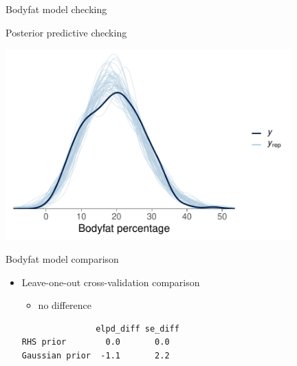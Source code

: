 \documentclass[english,t]{beamer}
\begin{document}
\begin{frame}
  
  {\Large\color{navyblue} Bodyfat model checking}

  Posterior predictive checking
  
  \includegraphics[width=11cm]{bodyfat_ppc.pdf}

\end{frame}

\begin{frame}[fragile]
  
  {\Large\color{navyblue} Bodyfat model comparison}

  \begin{itemize}
  \item Leave-one-out cross-validation comparison
    \begin{itemize}
    \item no difference
    \end{itemize}
\begin{verbatim}
               elpd_diff se_diff
RHS prior        0.0       0.0   
Gaussian prior  -1.1       2.2   
\end{verbatim}

\end{itemize}

\end{frame}
\end{document}
